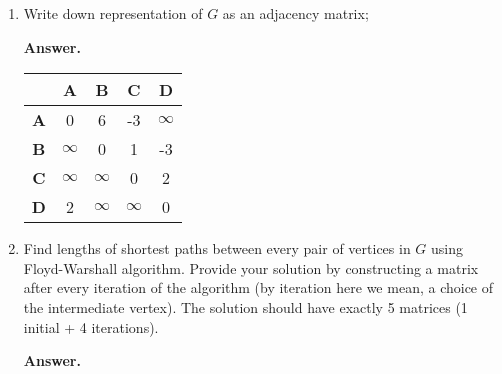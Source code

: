 \documentclass{article}
\begin{document}
\begin{enumerate}
    \item Write down representation of $G$ as an adjacency matrix;

    \textbf{Answer.}

    \begin{center}
        \begin{tabular}{|c|c|c|c|c|}
            \hline
            & \textbf{A} & \textbf{B} & \textbf{C} & \textbf{D} \\
            \hline
            \textbf{A} & 0 & 6 & -3 & $\infty$ \\
            \hline
            \textbf{B} & $\infty$ & 0 & 1 & -3 \\
            \hline
            \textbf{C} & $\infty$ & $\infty$ & 0 & 2 \\
            \hline
            \textbf{D} & 2 & $\infty$ & $\infty$ & 0 \\
            \hline
        \end{tabular}
    \end{center}
    
    \item Find lengths of shortest paths between every pair of vertices in $G$ using Floyd-Warshall algorithm. Provide your solution by constructing a matrix after every iteration of the algorithm (by iteration here we mean, a choice of the intermediate vertex). The solution should have exactly 5 matrices (1 initial + 4 iterations).

    \textbf{Answer.}


\end{enumerate}
\end{document}
